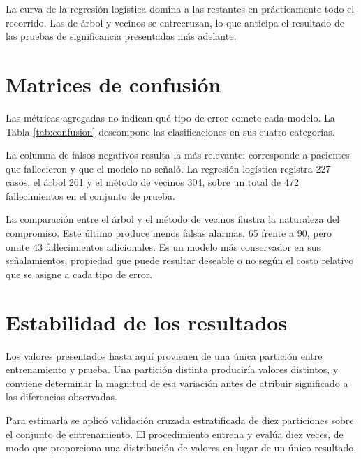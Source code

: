 \documentclass[11pt]{article}
\begin{document}
La curva de la regresión logística domina a las restantes en prácticamente todo el recorrido. Las
de árbol y vecinos se entrecruzan, lo que anticipa el resultado de las pruebas de significancia
presentadas más adelante.

\section{Matrices de confusión}

Las métricas agregadas no indican qué tipo de error comete cada modelo. La Tabla
\ref{tab:confusion} descompone las clasificaciones en sus cuatro categorías.



La columna de falsos negativos resulta la más relevante: corresponde a pacientes que fallecieron y
que el modelo no señaló. La regresión logística registra 227 casos, el árbol 261 y el método de
vecinos 304, sobre un total de 472 fallecimientos en el conjunto de prueba.

La comparación entre el árbol y el método de vecinos ilustra la naturaleza del compromiso. Este
último produce menos falsas alarmas, 65 frente a 90, pero omite 43 fallecimientos adicionales. Es
un modelo más conservador en sus señalamientos, propiedad que puede resultar deseable o no según
el costo relativo que se asigne a cada tipo de error.

\section{Estabilidad de los resultados}

Los valores presentados hasta aquí provienen de una única partición entre entrenamiento y prueba.
Una partición distinta produciría valores distintos, y conviene determinar la magnitud de esa
variación antes de atribuir significado a las diferencias observadas.

Para estimarla se aplicó validación cruzada estratificada de diez particiones sobre el conjunto de
entrenamiento. El procedimiento entrena y evalúa diez veces, de modo que proporciona una
distribución de valores en lugar de un único resultado.
\end{document}
